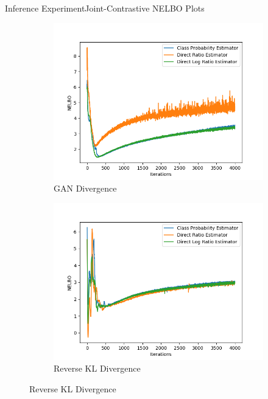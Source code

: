 \documentclass{beamer}
\begin{document}
\begin{frame}{Inference Experiment}{Joint-Contrastive NELBO Plots}
\begin{figure}
\begin{subfigure}{0.49\textwidth}
\includegraphics[width=\linewidth]{part2nelbos/JCADVvsJCADVexpvsJCADVgudlog.png}
\caption{GAN Divergence}
\end{subfigure}
\begin{subfigure}{0.49\textwidth}
\includegraphics[width=\linewidth]{part2nelbos/JCKLDvsJCKLexpvsJCKLgudlog.png}
\caption{Reverse KL Divergence}
\end{subfigure}
\end{figure}
\end{frame}
\end{document}
